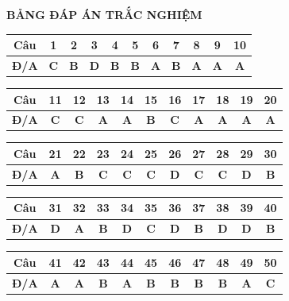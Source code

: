 
\vspace{0.3cm}
\noindent\begin{minipage}{\linewidth}
\begin{center}{\large\bfseries\color{red!80!black} BẢNG ĐÁP ÁN TRẮC NGHIỆM}\end{center}\smallskip
\begin{center}\begin{tabular}{|c|c|c|c|c|c|c|c|c|c|c|}\hline
\textbf{Câu} & 1 & 2 & 3 & 4 & 5 & 6 & 7 & 8 & 9 & 10 \\ \hline
\textbf{Đ/A} & \textbf{C} & \textbf{B} & \textbf{D} & \textbf{B} & \textbf{B} & \textbf{A} & \textbf{B} & \textbf{A} & \textbf{A} & \textbf{A} \\ \hline
\end{tabular}\end{center}\smallskip
\begin{center}\begin{tabular}{|c|c|c|c|c|c|c|c|c|c|c|}\hline
\textbf{Câu} & 11 & 12 & 13 & 14 & 15 & 16 & 17 & 18 & 19 & 20 \\ \hline
\textbf{Đ/A} & \textbf{C} & \textbf{C} & \textbf{A} & \textbf{A} & \textbf{B} & \textbf{C} & \textbf{A} & \textbf{A} & \textbf{A} & \textbf{A} \\ \hline
\end{tabular}\end{center}\smallskip
\begin{center}\begin{tabular}{|c|c|c|c|c|c|c|c|c|c|c|}\hline
\textbf{Câu} & 21 & 22 & 23 & 24 & 25 & 26 & 27 & 28 & 29 & 30 \\ \hline
\textbf{Đ/A} & \textbf{A} & \textbf{B} & \textbf{C} & \textbf{C} & \textbf{C} & \textbf{D} & \textbf{C} & \textbf{C} & \textbf{D} & \textbf{B} \\ \hline
\end{tabular}\end{center}\smallskip
\begin{center}\begin{tabular}{|c|c|c|c|c|c|c|c|c|c|c|}\hline
\textbf{Câu} & 31 & 32 & 33 & 34 & 35 & 36 & 37 & 38 & 39 & 40 \\ \hline
\textbf{Đ/A} & \textbf{D} & \textbf{A} & \textbf{B} & \textbf{D} & \textbf{C} & \textbf{D} & \textbf{B} & \textbf{D} & \textbf{D} & \textbf{B} \\ \hline
\end{tabular}\end{center}\smallskip
\begin{center}\begin{tabular}{|c|c|c|c|c|c|c|c|c|c|c|}\hline
\textbf{Câu} & 41 & 42 & 43 & 44 & 45 & 46 & 47 & 48 & 49 & 50 \\ \hline
\textbf{Đ/A} & \textbf{A} & \textbf{A} & \textbf{B} & \textbf{A} & \textbf{B} & \textbf{B} & \textbf{B} & \textbf{B} & \textbf{A} & \textbf{C} \\ \hline
\end{tabular}\end{center}\smallskip
\end{minipage}
